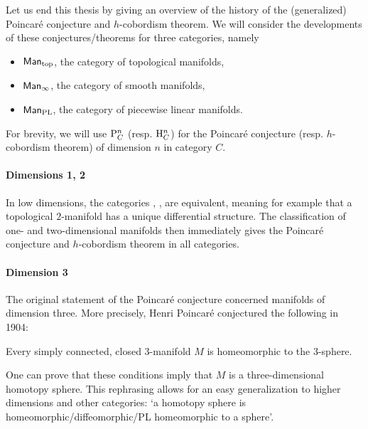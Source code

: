 Let us end this thesis by giving an overview of the history of the (generalized) Poincaré conjecture and $h$-cobordism theorem.
We will consider the developments of these conjectures/theorems for three categories, namely
\filbreak
\begin{itemize}
    \item $\textsf{Man}_{\text{top}}$, the category of topological manifolds,
    \item $\textsf{Man}_{\infty}$, the category of smooth manifolds,
    \item $\textsf{Man}_{\text{PL}}$, the category of piecewise linear manifolds.
\end{itemize}
For brevity, we will use $\mathrm P_{C}^{n}$ (resp. $\mathrm H_{C}^{n}$) for the Poincaré conjecture (resp. $h$-cobordism theorem) of dimension $n$ in category $C$.

\paragraph{Dimensions 1, 2}
In low dimensions, the categories \mans, \mant, \manp{} are equivalent, meaning for example that a topological $2$-manifold has a unique differential structure.
The classification of one- and two-dimensional manifolds then immediately gives the Poincaré conjecture and $h$-cobordism theorem in all categories.


\paragraph{Dimension 3}
The original statement of the Poincaré conjecture concerned manifolds of dimension three.
More precisely, Henri Poincaré conjectured the following in 1904:
\begin{theorem}
    Every simply connected, closed $3$-manifold $M$ is homeomorphic to the $3$-sphere.
\end{theorem}
One can prove that these conditions imply that $M$ is a three-dimensional homotopy sphere.
This rephrasing allows for an easy generalization to higher dimensions and other categories: `a homotopy sphere is homeomorphic/diffeomorphic/PL homeomorphic to a sphere'.

